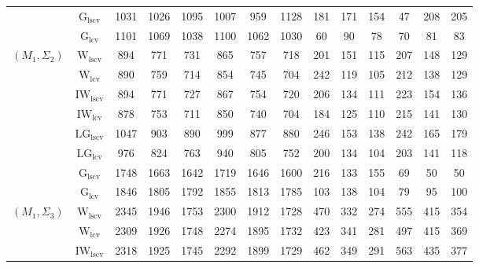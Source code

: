 \begin{table}[!ht]
{\begin{tabular}{@{}cc|ccc|ccc|ccc|ccc@{}}
 & $\mathrm{G}_{\mathrm{lscv}}$ & 1031 & 1026 & 1095 & 1007 & 959 & 1128 & 181 & 171 & 154 & \cellcolor{black!30}47 & 208 & 205 \\ 
 & $\mathrm{G}_{\mathrm{lcv}}$ & 1101 & 1069 & 1038 & 1100 & 1062 & 1030 & \cellcolor{black!30}60 & 90 & 78 & \cellcolor{black!10}70 & \cellcolor{black!30}81 & \cellcolor{black!10}83 \\ 
\midrule
$(M_1,\Sigma_2)$ & $\mathrm{W}_{\mathrm{lscv}}$ & 894 & 771 & 731 & 865 & 757 & 718 & 201 & 151 & 115 & 207 & 148 & 129 \\ 
 & $\mathrm{W}_{\mathrm{lcv}}$ & \cellcolor{black!10}890 & \cellcolor{black!10}759 & \cellcolor{black!10}714 & \cellcolor{black!10}854 & \cellcolor{black!10}745 & \cellcolor{black!30}704 & 242 & \cellcolor{black!30}119 & 105 & 212 & 138 & 129 \\ 
 & $\mathrm{IW}_{\mathrm{lscv}}$ & 894 & 771 & 727 & 867 & 754 & 720 & 206 & 134 & 111 & 223 & 154 & 136 \\ 
 & $\mathrm{IW}_{\mathrm{lcv}}$ & \cellcolor{black!30}878 & \cellcolor{black!30}753 & \cellcolor{black!30}711 & \cellcolor{black!30}850 & \cellcolor{black!30}740 & \cellcolor{black!10}704 & \cellcolor{black!10}184 & \cellcolor{black!10}125 & 110 & 215 & 141 & 130 \\ 
 & $\mathrm{LG}_{\mathrm{lscv}}$ & 1047 & 903 & 890 & 999 & 877 & 880 & 246 & 153 & 138 & 242 & 165 & 179 \\ 
 & $\mathrm{LG}_{\mathrm{lcv}}$ & 976 & 824 & 763 & 940 & 805 & 752 & 200 & 134 & \cellcolor{black!30}104 & 203 & 141 & 118 \\ 
 & $\mathrm{G}_{\mathrm{lscv}}$ & 1748 & 1663 & 1642 & 1719 & 1646 & 1600 & 216 & 133 & 155 & \cellcolor{black!30}69 & \cellcolor{black!30}50 & \cellcolor{black!30}50 \\ 
 & $\mathrm{G}_{\mathrm{lcv}}$ & 1846 & 1805 & 1792 & 1855 & 1813 & 1785 & \cellcolor{black!30}103 & 138 & \cellcolor{black!10}104 & \cellcolor{black!10}79 & \cellcolor{black!10}95 & \cellcolor{black!10}100 \\ 
\midrule
$(M_1,\Sigma_3)$ & $\mathrm{W}_{\mathrm{lscv}}$ & 2345 & 1946 & 1753 & 2300 & 1912 & \cellcolor{black!10}1728 & 470 & \cellcolor{black!10}332 & \cellcolor{black!10}274 & 555 & 415 & 354 \\ 
 & $\mathrm{W}_{\mathrm{lcv}}$ & \cellcolor{black!10}2309 & 1926 & 1748 & \cellcolor{black!10}2274 & \cellcolor{black!10}1895 & 1732 & \cellcolor{black!10}423 & 341 & 281 & 497 & 415 & 369 \\ 
 & $\mathrm{IW}_{\mathrm{lscv}}$ & 2318 & \cellcolor{black!10}1925 & \cellcolor{black!10}1745 & 2292 & 1899 & 1729 & 462 & 349 & 291 & 563 & 435 & 377 \\ 

\end{tabular}}
\end{table}
